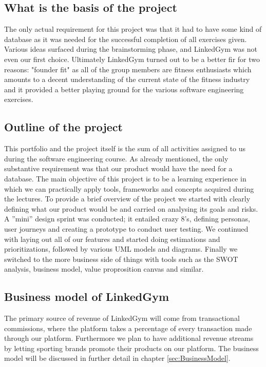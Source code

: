 \subsection{What is the basis of the project}

The only actual requirement for this project was that it had to have some kind of database as it was needed for the successful completion of all exercises given.
Various ideas surfaced during the brainstorming phase, and LinkedGym was not even our first choice. Ultimately LinkedGym turned out to be a better fir for two reasons: "founder fit" as all of the group members are fitness enthusiasts which amounts to a decent understanding of the current state of the fitness industry and it provided a better playing ground for the various software engineering exercises.

\subsection{Outline of the project}
\label{sec:MiniSprint}

This portfolio and the project itself is the sum of all activities assigned to us during the software engineering course. As already mentioned, the only substantive requirement was that our product would have the need for a database. The main objective of this project is to be a learning experience in which we can practically apply tools, frameworks and concepts acquired during the lectures.
To provide a brief overview of the project we started with clearly defining what our product would be and carried on analysing its goals and risks. A ''mini'' design sprint was conducted; it entailed crazy 8's, defining personas, user journeys and creating a prototype to conduct user testing. We continued with laying out all of our features and started doing estimations and prioritizations, followed by various UML models and diagrams. Finally we switched to the more business side of things with tools such as the SWOT analysis, business model, value proprosition canvas and similar.

\subsection{Business model of LinkedGym}

The primary source of revenue of LinkedGym will come from transactional commissions, where the platform takes a percentage of every transaction made through our platform. Furthermore we plan to have additional revenue streams by letting sporting brands promote their products on our platform.
The business model will be discussed in further detail in chapter \ref{sec:BusinessModel}.

